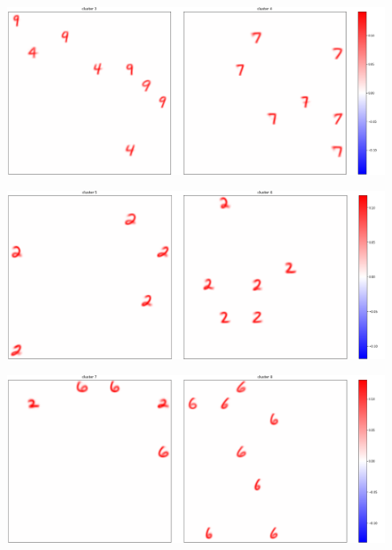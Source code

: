 \documentclass[a4paper]{report}
\begin{document}
\begin{figure} [H]
                                                                                                                                                                                                                                                                                                                                                                                                                                                                                                                                                                                                                                                                                                                                                                                                                              
\end{figure}

\begin{figure} [H]
    \centering
    \includegraphics [width=\textwidth ] {c/e/3.png}
    \caption{}
\end{figure}

\begin{figure} [H]
    \centering
    \includegraphics [width=\textwidth ] {c/e/5.png}
    \caption{}
\end{figure}

\begin{figure} [H]
    \centering
    \includegraphics [width=\textwidth ] {c/e/7.png}
    \caption{}
\end{figure}
\end{document}
